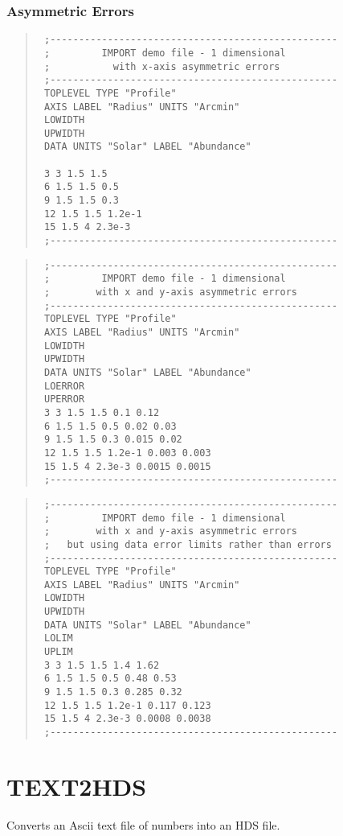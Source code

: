 \documentclass{book}
\renewcommand{\_}{{\tt\char'137}}     %
\begin{document}
\subsubsection{Asymmetric Errors}
\begin{quote}\begin{verbatim}
 ;--------------------------------------------------
 ;         IMPORT demo file - 1 dimensional
 ;           with x-axis asymmetric errors
 ;--------------------------------------------------
 TOPLEVEL TYPE "Profile"
 AXIS LABEL "Radius" UNITS "Arcmin"
 LOWIDTH
 UPWIDTH
 DATA UNITS "Solar" LABEL "Abundance"

 3 3 1.5 1.5
 6 1.5 1.5 0.5
 9 1.5 1.5 0.3
 12 1.5 1.5 1.2e-1
 15 1.5 4 2.3e-3
 ;--------------------------------------------------
\end{verbatim}\end{quote}
\begin{quote}\begin{verbatim}
 ;--------------------------------------------------
 ;         IMPORT demo file - 1 dimensional
 ;        with x and y-axis asymmetric errors
 ;--------------------------------------------------
 TOPLEVEL TYPE "Profile"
 AXIS LABEL "Radius" UNITS "Arcmin"
 LOWIDTH
 UPWIDTH
 DATA UNITS "Solar" LABEL "Abundance"
 LOERROR
 UPERROR
 3 3 1.5 1.5 0.1 0.12
 6 1.5 1.5 0.5 0.02 0.03
 9 1.5 1.5 0.3 0.015 0.02
 12 1.5 1.5 1.2e-1 0.003 0.003
 15 1.5 4 2.3e-3 0.0015 0.0015
 ;--------------------------------------------------
\end{verbatim}\end{quote}
\begin{quote}\begin{verbatim}
 ;--------------------------------------------------
 ;         IMPORT demo file - 1 dimensional
 ;        with x and y-axis asymmetric errors
 ;   but using data error limits rather than errors
 ;--------------------------------------------------
 TOPLEVEL TYPE "Profile"
 AXIS LABEL "Radius" UNITS "Arcmin"
 LOWIDTH
 UPWIDTH
 DATA UNITS "Solar" LABEL "Abundance"
 LOLIM
 UPLIM
 3 3 1.5 1.5 1.4 1.62
 6 1.5 1.5 0.5 0.48 0.53
 9 1.5 1.5 0.3 0.285 0.32
 12 1.5 1.5 1.2e-1 0.117 0.123
 15 1.5 4 2.3e-3 0.0008 0.0038
 ;--------------------------------------------------
\end{verbatim}\end{quote}
\section{TEXT2HDS}
Converts an Ascii text file of numbers into an HDS file.
\end{document}
